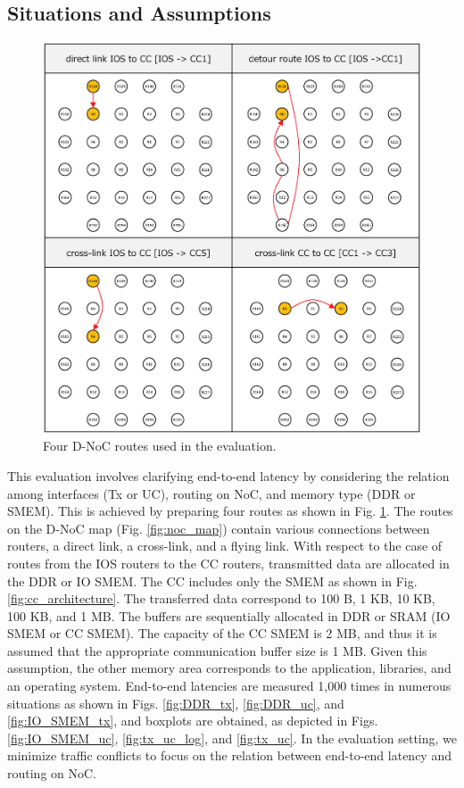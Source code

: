 \subsection{Situations and Assumptions}
\label{sec:situations_and_assumptions2}

\begin{figure}[!htbp]
  \centering
  \includegraphics[width=0.5\linewidth]{../figure/noc_routes_old.eps}
      \caption{\label{fig:noc_routes}
    Four D-NoC routes used in the evaluation.}
\end{figure}

This evaluation involves clarifying end-to-end latency by considering the relation among interfaces (Tx or UC), routing on NoC, and memory type (DDR or SMEM).
This is achieved by preparing four routes as shown in Fig. \ref{fig:noc_routes}.
The routes on the D-NoC map (Fig. \ref{fig:noc_map}) contain various connections between routers, a direct link, a cross-link, and a flying link.
With respect to the case of routes from the IOS routers to the CC routers, transmitted data are allocated in the DDR or IO SMEM.
The CC includes only the SMEM as shown in Fig. \ref{fig:cc_architecture}.
The transferred data correspond to 100 B, 1 KB, 10 KB, 100 KB, and 1 MB.
The buffers are sequentially allocated in DDR or SRAM (IO SMEM or CC SMEM).
The capacity of the CC SMEM is 2 MB, and thus it is assumed that the appropriate communication buffer size is 1 MB.
Given this assumption, the other memory area corresponds to the application, libraries, and an operating system.
End-to-end latencies are measured 1,000 times in numerous situations as shown in Figs. \ref{fig:DDR_tx}, \ref{fig:DDR_uc}, and \ref{fig:IO_SMEM_tx}, and boxplots are obtained, as depicted in Figs. \ref{fig:IO_SMEM_uc}, \ref{fig:tx_uc_log}, and \ref{fig:tx_uc}.
In the evaluation setting, we minimize traffic conflicts to focus on the relation between end-to-end latency and routing on NoC.

